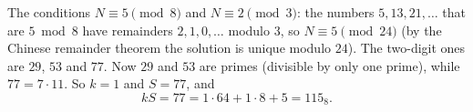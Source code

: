 The conditions $N\equiv5\pmod8$ and $N\equiv2\pmod3$: the numbers $5,13,21,\dots$ that are $5\bmod8$ have remainders $2,1,0,\dots$ modulo $3$, so $N\equiv5\pmod{24}$ (by the Chinese remainder theorem the solution is unique modulo $24$). The two-digit ones are $29$, $53$ and $77$. Now $29$ and $53$ are primes (divisible by only one prime), while $77=7\cdot11$. So $k=1$ and $S=77$, and
\[kS=77=1\cdot64+1\cdot8+5=\boxed{115_8}.\]
